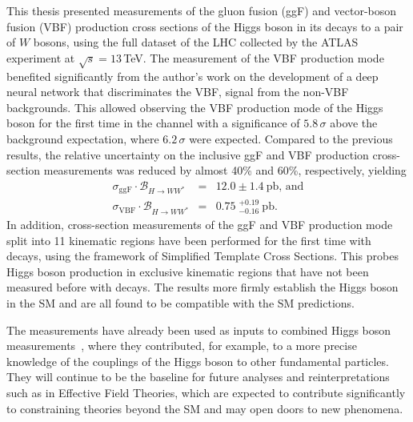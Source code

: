 This thesis presented measurements of the gluon fusion (ggF) and vector-boson fusion (VBF) production cross sections of the Higgs boson in its decays to a pair of $W$ bosons, using the full \RunTwo dataset of the LHC collected by the ATLAS experiment at $\sqrt{s} = 13\,$TeV. 
The measurement of the VBF production mode benefited significantly from the author's work on the development of a deep neural network that discriminates the VBF, \HWW signal from the non-VBF backgrounds. 
This allowed observing the VBF production mode of the Higgs boson for the first time in the \HWW channel with a significance of $5.8\,\sigma$ above the background expectation, where $6.2\,\sigma$ were expected.
Compared to the previous \RunTwo results, the relative uncertainty on the inclusive ggF and VBF production cross-section measurements was reduced by almost 40\% and 60\%, respectively, yielding 
\begin{eqnarray*}
    \sigma_{\mathrm{ggF}} \cdot \mathcal{B}_{H \to WW^{\ast}} &=& 12.0 \pm 1.4~\mathrm{pb}, \,\text{and} \\
    \sigma_{\mathrm{VBF}} \cdot \mathcal{B}_{H \to WW^{\ast}} &=& 0.75\;^{+0.19}_{-0.16}~\mathrm{pb}.
\end{eqnarray*}
In addition, cross-section measurements of the ggF and VBF production mode split into 11 kinematic regions have been performed for the first time with \HWW decays, using the framework of Simplified Template Cross Sections. This probes Higgs boson production in exclusive kinematic regions that have not been measured before with \HWW decays.
The results more firmly establish the Higgs boson in the SM and are all found to be compatible with the SM predictions.

The measurements have already been used as inputs to combined Higgs boson measurements~\cite{NaturePaper}, where they contributed, for example, to a more precise knowledge of the couplings of the Higgs boson to other fundamental particles. 
They will continue to be the baseline for future analyses and reinterpretations such as in Effective Field Theories, which are expected to contribute significantly to constraining theories beyond the SM and may open doors to new phenomena.

